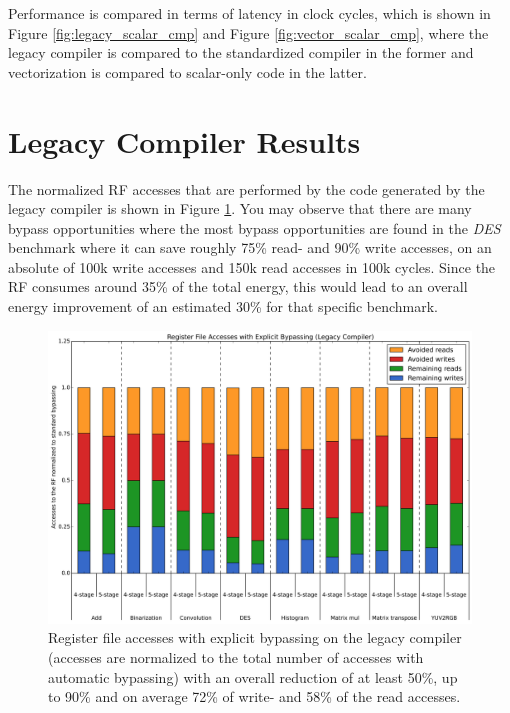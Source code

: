 Performance is compared in terms of latency in clock cycles, which is shown in Figure \ref{fig:legacy_scalar_cmp} and Figure \ref{fig:vector_scalar_cmp}, where the legacy compiler is compared to the standardized compiler in the former and vectorization is compared to scalar-only code in the latter. %

\section{Legacy Compiler Results}
The normalized RF accesses that are performed by the code generated by the legacy compiler is shown in Figure \ref{fig:legacy_access_improvements}. You may observe that there are many bypass opportunities where the most bypass opportunities are found in the \emph{DES} benchmark where it can save roughly 75\% read- and 90\% write accesses, on an absolute of 100k write accesses and 150k read accesses in 100k cycles. Since the RF consumes around 35\% of the total energy, this would lead to an overall energy improvement of an estimated 30\% for that specific benchmark.

\begin{figure}[t!]
\centering
\hspace*{-.12in}
\includegraphics[width=.875\textwidth]{figures/stats/legacy_accesses}
\caption{Register file accesses with explicit bypassing on the legacy compiler (accesses are normalized to the total number of accesses with automatic bypassing) with an overall reduction of at least 50\%, up to 90\% and on average 72\% of write- and 58\% of the read accesses.} %
\label{fig:legacy_access_improvements}
\end{figure}

